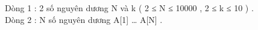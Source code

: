Dòng 1 : 2 số nguyên dương N và k ( 2 ≤ N ≤ 10000 , 2 ≤ k ≤ 10 ) .   
\\   Dòng 2 : N số nguyên dương A[1] … A[N] .  

\